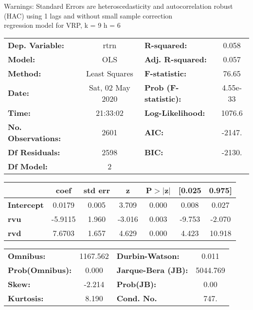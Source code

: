 Warnings: \newline
 [1] Standard Errors are heteroscedasticity and autocorrelation robust (HAC) using 1 lags and without small sample correction\\ 

regression model for VRP, k = 9 h = 6\begin{center}
\begin{tabular}{lclc}
\toprule
\textbf{Dep. Variable:}    &       rtrn       & \textbf{  R-squared:         } &     0.058   \\
\textbf{Model:}            &       OLS        & \textbf{  Adj. R-squared:    } &     0.057   \\
\textbf{Method:}           &  Least Squares   & \textbf{  F-statistic:       } &     76.65   \\
\textbf{Date:}             & Sat, 02 May 2020 & \textbf{  Prob (F-statistic):} &  4.55e-33   \\
\textbf{Time:}             &     21:33:02     & \textbf{  Log-Likelihood:    } &    1076.6   \\
\textbf{No. Observations:} &        2601      & \textbf{  AIC:               } &    -2147.   \\
\textbf{Df Residuals:}     &        2598      & \textbf{  BIC:               } &    -2130.   \\
\textbf{Df Model:}         &           2      & \textbf{                     } &             \\
\bottomrule
\end{tabular}
\begin{tabular}{lcccccc}
                   & \textbf{coef} & \textbf{std err} & \textbf{z} & \textbf{P$> |$z$|$} & \textbf{[0.025} & \textbf{0.975]}  \\
\midrule
\textbf{Intercept} &       0.0179  &        0.005     &     3.709  &         0.000        &        0.008    &        0.027     \\
\textbf{rvu}       &      -5.9115  &        1.960     &    -3.016  &         0.003        &       -9.753    &       -2.070     \\
\textbf{rvd}       &       7.6703  &        1.657     &     4.629  &         0.000        &        4.423    &       10.918     \\
\bottomrule
\end{tabular}
\begin{tabular}{lclc}
\textbf{Omnibus:}       & 1167.562 & \textbf{  Durbin-Watson:     } &    0.011  \\
\textbf{Prob(Omnibus):} &   0.000  & \textbf{  Jarque-Bera (JB):  } & 5044.769  \\
\textbf{Skew:}          &  -2.214  & \textbf{  Prob(JB):          } &     0.00  \\
\textbf{Kurtosis:}      &   8.190  & \textbf{  Cond. No.          } &     747.  \\
\bottomrule
\end{tabular}
\end{center}

